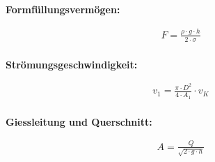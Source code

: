 \begin{minipage}{0.6\linewidth}
    \textbf{Formfüllungsvermögen:}
\end{minipage}
\begin{minipage}{0.4\linewidth}
    \[
        \boxed{       
            \begin{aligned}
                F=\frac{\rho \cdot g \cdot h}{2\cdot \sigma} \\
            \end{aligned}
        }
    \]
\end{minipage}
\vspace{1mm}

\begin{minipage}{0.6\linewidth}
    \textbf{Strömungsgeschwindigkeit:}
\end{minipage}
\begin{minipage}{0.4\linewidth}
    \[
        \boxed{       
            \begin{aligned}
                v_1=\frac{\pi \cdot D^2}{4 \cdot A_1}\cdot v_K\\            
            \end{aligned}
        }
    \]
\end{minipage}
\vspace{1mm}

\begin{minipage}{0.6\linewidth}
    \textbf{Giessleitung und Querschnitt:}
\end{minipage}
\begin{minipage}{0.4\linewidth}
    \[
        \boxed{       
            \begin{aligned}
                A=\frac{Q}{\sqrt{2\cdot g \cdot h}}\\           
            \end{aligned}
        }
    \]
\end{minipage}
\vspace{1mm}